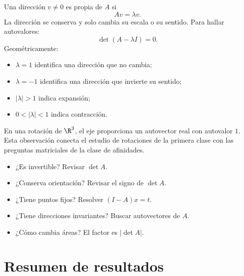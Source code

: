 Una dirección \(v\neq0\) es propia de \(A\) si
\[
  Av=\lambda v.
\]
La dirección se conserva y solo cambia su escala o su sentido. Para hallar autovalores:
\[
  \det(A-\lambda I)=0.
\]
Geométricamente:
\begin{itemize}
  \item \(\lambda=1\) identifica una dirección que no cambia;
  \item \(\lambda=-1\) identifica una dirección que invierte su sentido;
  \item \(|\lambda|>1\) indica expansión;
  \item \(0<|\lambda|<1\) indica contracción.
\end{itemize}

En una rotación de \(\R^3\), el eje proporciona un autovector real con autovalor \(1\). Esta
observación conecta el estudio de rotaciones de la primera clase con las preguntas matriciales
de la clase de afinidades.

\begin{idea}
\begin{itemize}
  \item ¿Es invertible? Revisar \(\det A\).
  \item ¿Conserva orientación? Revisar el signo de \(\det A\).
  \item ¿Tiene puntos fijos? Resolver \((I-A)x=t\).
  \item ¿Tiene direcciones invariantes? Buscar autovectores de \(A\).
  \item ¿Cómo cambia áreas? El factor es \(|\det A|\).
\end{itemize}
\end{idea}

\section{Resumen de resultados}

